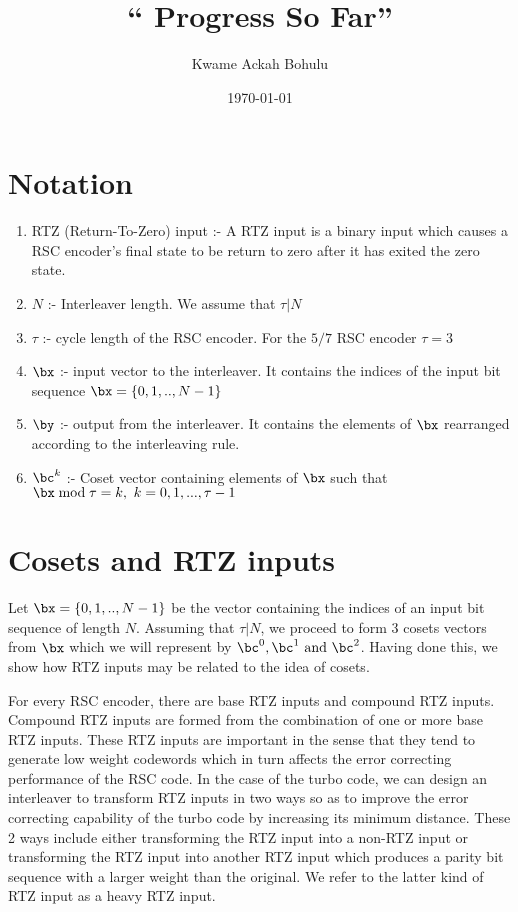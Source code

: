 \documentclass[11pt, oneside, dvipdfmx]{book}
\title{``
Progress So Far'' }
\author{Kwame Ackah Bohulu}
\date{\today}
\begin{document}
\maketitle
\section{Notation}
\begin{enumerate}
\item RTZ (Return-To-Zero) input :- A RTZ input is a binary input which causes a RSC encoder's final state to be return to zero after it has exited the zero state.

\item $N$ :- Interleaver length. We assume that $\tau | N$

\item $\tau$ :- cycle length of the RSC encoder. For the $5/7$ RSC encoder $\tau = 3$

\item $\bx$ :- input vector to the interleaver. It contains the indices of the input bit sequence $\bx = \{0,1,..,N-1\}$

\item $\by$ :- output from  the interleaver. It contains the elements of $\bx$ rearranged according to the interleaving rule.

\item $\bc^k$ :- Coset vector containing elements of $\bx$ such that $\bx \bmod \tau = k,~k=0,1,...,\tau-1$
\end{enumerate}


\section{Cosets and RTZ inputs}
Let $\bx=\{0,1,..,N-1\}$ be the vector containing the indices of an input bit sequence of length $N$. Assuming that $\tau | N$, we proceed to form $3$ cosets vectors from $\bx$ which we will represent by $\bc^0,\bc^1~\text{and}~\bc^2$.  Having done this, we show how RTZ inputs may be related to the idea of cosets.

For every RSC encoder, there are base RTZ inputs and compound RTZ inputs. Compound RTZ inputs are formed from the combination of one or more base RTZ inputs. These RTZ inputs are important in the sense that they tend to generate low weight codewords which in turn affects the error correcting performance of the RSC code. In the case of the turbo code, we can design an interleaver to transform RTZ inputs in two ways so as to improve the error correcting capability of the turbo code by increasing its minimum distance. These 2 ways include either transforming the RTZ input into a non-RTZ input or transforming the RTZ input into another RTZ input which produces a parity bit sequence with a larger weight than the original. We refer to the latter kind of RTZ input as a heavy RTZ input.
\end{document}
